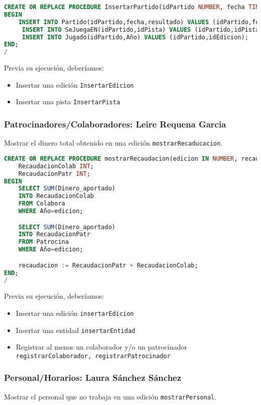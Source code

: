 \begin{lstlisting}[language=sql]
CREATE OR REPLACE PROCEDURE InsertarPartido(idPartido NUMBER, fecha TIMESTAMP, resultado VARCHAR2, idEdicion NUMBER, idPista NUMBER) IS
BEGIN
	INSERT INTO Partido(idPartido,fecha,resultado) VALUES (idPartido,fecha,resultado);
	 INSERT INTO SeJuegaEN(idPartido,idPista) VALUES (idPartido,idPista);
	 INSERT INTO Jugado(idPartido,Año) VALUES (idPartido,idEdicion);
END;
/
\end{lstlisting}

Previa su ejecución, deberíamos:
\begin{itemize}
	\item Insertar una edición \texttt{InsertarEdicion}
	\item Insertar una pista \texttt{InsertarPista}
\end{itemize}

\pagebreak

\subsubsection{Patrocinadores/Colaboradores: Leire Requena Garcia}
Mostrar el dinero total obtenido en una edición \texttt{mostrarRecaducacion}.

\begin{lstlisting}[language=sql]
CREATE OR REPLACE PROCEDURE mostrarRecaudacion(edicion IN NUMBER, recaudacion OUT NUMBER) IS
	RecaudacionColab INT;
	RecaudacionPatr INT;
BEGIN
	SELECT SUM(Dinero_aportado)
	INTO RecaudacionColab
	FROM Colabora
	WHERE Año=edicion;

	SELECT SUM(Dinero_aportado)
	INTO RecaudacionPatr
	FROM Patrocina
	WHERE Año=edicion;

	recaudacion := RecaudacionPatr + RecaudacionColab;
END;
/
\end{lstlisting}

Previa su ejecución, deberíamos:
\begin{itemize}
	\item Insertar una edición \texttt{insertarEdicion}
	\item Insertar una entidad \texttt{insertarEntidad}
	\item Registrar al menos un colaborador y/o un patrocinador \texttt{registrarColaborador, registrarPatrocinador}
\end{itemize}

\subsubsection{Personal/Horarios: Laura Sánchez Sánchez}
Mostrar el personal que no trabaja en una edición \texttt{mostrarPersonal}.

